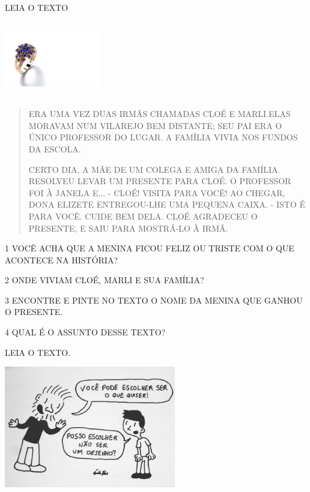 
LEIA O TEXTO

\includegraphics[width=1.66667in,height=1.30208in]{media/image163.jpg}

\begin{quote}
ERA UMA VEZ DUAS IRMÃS CHAMADAS CLOÉ E MARLI.ELAS MORAVAM NUM VILAREJO
BEM DISTANTE; SEU PAI ERA O ÚNICO PROFESSOR DO LUGAR. A FAMÍLIA VIVIA
NOS FUNDOS DA ESCOLA.

CERTO DIA, A MÃE DE UM COLEGA E AMIGA DA FAMÍLIA RESOLVEU LEVAR UM
PRESENTE PARA CLOÉ. O PROFESSOR FOI À JANELA E... - CLOÉ! VISITA PARA
VOCÊ! AO CHEGAR, DONA ELIZETE ENTREGOU-LHE UMA PEQUENA CAIXA. - ISTO É
PARA VOCÊ. CUIDE BEM DELA. CLOÉ AGRADECEU O PRESENTE, E SAIU PARA
MOSTRÁ-LO À IRMÃ.
\end{quote}


\num{1} VOCÊ ACHA QUE A MENINA FICOU FELIZ OU TRISTE COM O QUE ACONTECE NA HISTÓRIA?


\num{2} ONDE VIVIAM CLOÉ, MARLI E SUA FAMÍLIA?


\num{3} ENCONTRE E PINTE NO TEXTO O NOME DA MENINA QUE GANHOU O PRESENTE.

\num{4} QUAL É O ASSUNTO DESSE TEXTO?


LEIA O TEXTO.

\includegraphics[width=2.95254in,height=2.09138in]{media/image164.jpg}


